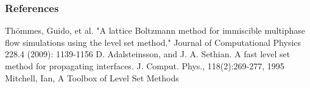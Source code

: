 \documentclass[ucs]{beamer}
\begin{document}
\begin{frame}
\frametitle{References}
\begin{thebibliography}{etw}
     Thömmes, Guido, et al. "A lattice Boltzmann method for immiscible multiphase flow simulations using the level set method." Journal of Computational Physics 228.4 (2009): 1139-1156
     D. Adalsteinsson, and J. A. Sethian. A fast level set method for propagating interfaces. J. Comput. Phys., 118(2):269-277, 1995
     Mitchell, Ian, A Toolbox of Level Set Methods
\end{thebibliography}
\end{frame}
\end{document}
